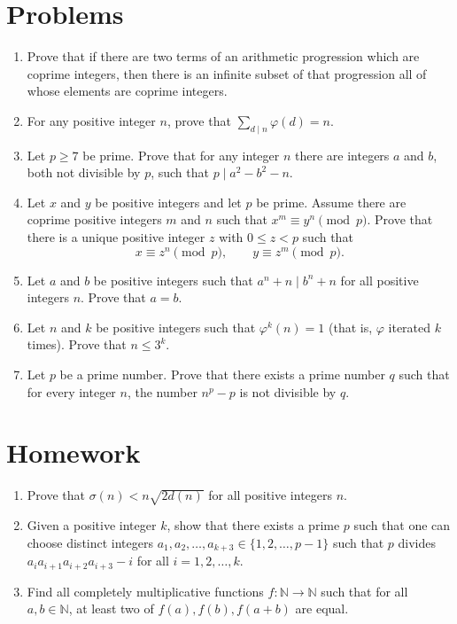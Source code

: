 \documentclass{article}
\begin{document}
\section{Problems}
\begin{enumerate}
  \item Prove that if there are two terms of an arithmetic progression which are
    coprime integers, then there is an infinite subset of that
    progression all of whose elements are coprime integers.
  \item For any positive integer $n$, prove that $\displaystyle\sum_{d\mid
    n}\varphi(d)=n$.
  \item Let $p\ge 7$ be prime. Prove that for any integer $n$ there are integers $a$ and
    $b$, both not divisible by $p$, such that $p\mid a^2-b^2-n$.
  \item Let $x$ and $y$ be positive integers and let $p$ be prime. Assume there
    are coprime positive integers $m$ and $n$ such that $x^m\equiv y^n\pmod p$.
    Prove that there is a unique positive integer $z$ with $0\le z<p$ such that
    \[x\equiv z^n\pmod p,\qquad y\equiv z^m\pmod p.\]
  \item Let $a$ and $b$ be positive integers such that $a^n+n\mid b^n+n$ for all
    positive integers $n$. Prove that $a=b$.
  \item Let $n$ and $k$ be positive integers such that $\varphi^k(n)=1$ (that
    is, $\varphi$ iterated $k$ times). Prove that
    $n\le 3^k$.
  \item Let $p$ be a prime number. Prove that there exists a prime number $q$
    such that for every integer $n$, the number $n^p-p$ is not divisible by $q$.
\end{enumerate}
\newpage
\section{Homework}
\begin{enumerate}
  \item Prove that $\sigma(n)<n\sqrt{2d(n)}$ for all positive integers $n$.
  \item Given a positive integer $k$, show that there exists a prime $p$ such
    that one can choose distinct integers
    $a_1,a_2,\ldots,a_{k+3}\in\{1,2,\ldots,p-1\}$ such that $p$ divides
    $a_i a_{i+1}a_{i+2}a_{i+3}-i$ for all $i=1,2,\ldots,k$.
  \item Find all completely multiplicative functions $f:\mathbb N\to\mathbb N$
    such that for all $a,b\in\mathbb N$, at least two of $f(a),f(b),f(a+b)$ are
    equal.
\end{enumerate}
\end{document}
